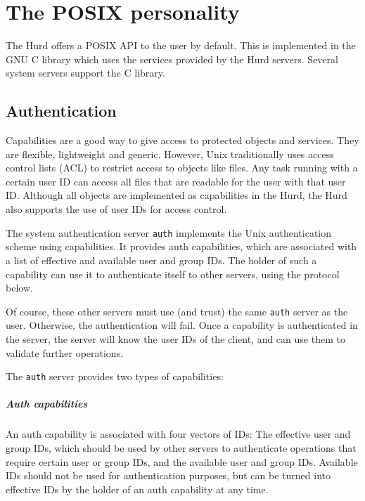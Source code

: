 \chapter{The POSIX personality}

The Hurd offers a POSIX API to the user by default.  This is
implemented in the GNU C library which uses the services provided by
the Hurd servers.  Several system servers support the C library.


\section{Authentication}
\label{auth}

Capabilities are a good way to give access to protected objects and
services.  They are flexible, lightweight and generic.  However, Unix
traditionally uses access control lists (ACL) to restrict access to
objects like files.  Any task running with a certain user ID can
access all files that are readable for the user with that user ID.
Although all objects are implemented as capabilities in the Hurd, the
Hurd also supports the use of user IDs for access control.

The system authentication server \texttt{auth} implements the Unix
authentication scheme using capabilities.  It provides auth
capabilities, which are associated with a list of effective and
available user and group IDs.  The holder of such a capability can use
it to authenticate itself to other servers, using the protocol below.

Of course, these other servers must use (and trust) the same
\texttt{auth} server as the user.  Otherwise, the authentication will
fail.  Once a capability is authenticated in the server, the server
will know the user IDs of the client, and can use them to validate
further operations.

The \texttt{auth} server provides two types of capabilities:

\paragraph{Auth capabilities}
An auth capability is associated with four vectors of IDs: The
effective user and group IDs, which should be used by other servers to
authenticate operations that require certain user or group IDs, and
the available user and group IDs.  Available IDs should not be used
for authentication purposes, but can be turned into effective IDs by
the holder of an auth capability at any time.

